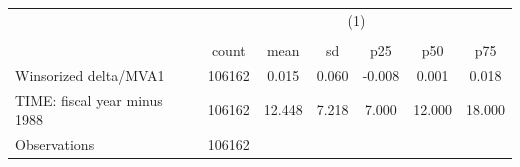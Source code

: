 {
\def\sym#1{\ifmmode^{#1}\else\(^{#1}\)\fi}
\begin{tabular}{l*{1}{cccccc}}
\hline\hline
                    &\multicolumn{6}{c}{(1)}                                                      \\
                    &\multicolumn{6}{c}{}                                                         \\
                    &       count&        mean&          sd&         p25&         p50&         p75\\
\hline
Winsorized delta/MVA1&      106162&       0.015&       0.060&      -0.008&       0.001&       0.018\\
TIME: fiscal year minus 1988&      106162&      12.448&       7.218&       7.000&      12.000&      18.000\\
\hline
Observations        &      106162&            &            &            &            &            \\
\hline\hline
\end{tabular}
}
